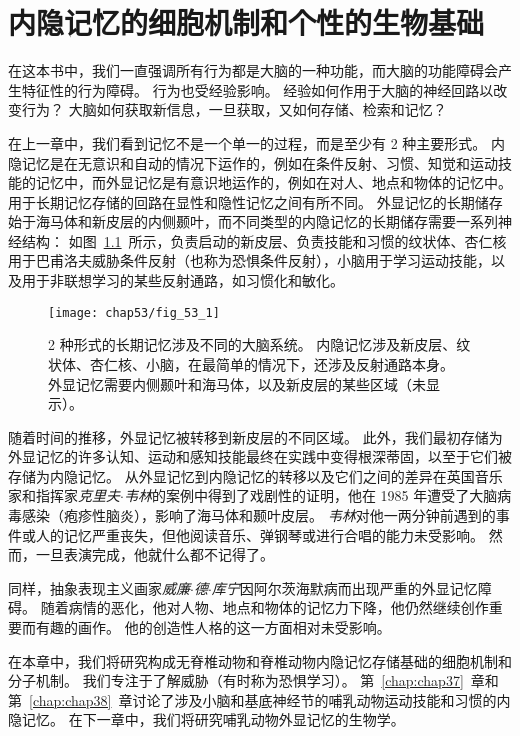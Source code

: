 \chapter{内隐记忆的细胞机制和个性的生物基础} \label{chap:chap53}

在这本书中，我们一直强调所有行为都是大脑的一种功能，而大脑的功能障碍会产生特征性的行为障碍。
行为也受经验影响。
经验如何作用于大脑的神经回路以改变行为？
大脑如何获取新信息，一旦获取，又如何存储、检索和记忆？


在上一章中，我们看到记忆不是一个单一的过程，而是至少有 2 种主要形式。
内隐记忆是在无意识和自动的情况下运作的，例如在条件反射、习惯、知觉和运动技能的记忆中，而外显记忆是有意识地运作的，例如在对人、地点和物体的记忆中。
用于长期记忆存储的回路在显性和隐性记忆之间有所不同。
外显记忆的长期储存始于海马体和新皮层的内侧颞叶，而不同类型的内隐记忆的长期储存需要一系列神经结构：
如图~\ref{fig:53_1}~所示，负责启动的新皮层、负责技能和习惯的纹状体、杏仁核用于巴甫洛夫威胁条件反射（也称为恐惧条件反射），小脑用于学习运动技能，以及用于非联想学习的某些反射通路，如习惯化和敏化。


\begin{figure}[htbp]
	\centering
	\texttt{[image: chap53/fig\_53\_1]}
	\caption{2 种形式的长期记忆涉及不同的大脑系统。
		内隐记忆涉及新皮层、纹状体、杏仁核、小脑，在最简单的情况下，还涉及反射通路本身。
		外显记忆需要内侧颞叶和海马体，以及新皮层的某些区域（未显示）。}
	\label{fig:53_1}
\end{figure}


随着时间的推移，外显记忆被转移到新皮层的不同区域。
此外，我们最初存储为外显记忆的许多认知、运动和感知技能最终在实践中变得根深蒂固，以至于它们被存储为内隐记忆。
从外显记忆到内隐记忆的转移以及它们之间的差异在英国音乐家和指挥家\textit{克里夫$\cdot$韦林}的案例中得到了戏剧性的证明，他在 1985 年遭受了大脑病毒感染（疱疹性脑炎），影响了海马体和颞叶皮层。
\textit{韦林}对他一两分钟前遇到的事件或人的记忆严重丧失，但他阅读音乐、弹钢琴或进行合唱的能力未受影响。
然而，一旦表演完成，他就什么都不记得了。


同样，抽象表现主义画家\textit{威廉$\cdot$德$\cdot$库宁}因阿尔茨海默病而出现严重的外显记忆障碍。
随着病情的恶化，他对人物、地点和物体的记忆力下降，他仍然继续创作重要而有趣的画作。
他的创造性人格的这一方面相对未受影响。


在本章中，我们将研究构成无脊椎动物和脊椎动物内隐记忆存储基础的细胞机制和分子机制。
我们专注于了解威胁（有时称为恐惧学习）。
第~\ref{chap:chap37}~章和第~\ref{chap:chap38}~章讨论了涉及小脑和基底神经节的哺乳动物运动技能和习惯的内隐记忆。
在下一章中，我们将研究哺乳动物外显记忆的生物学。



